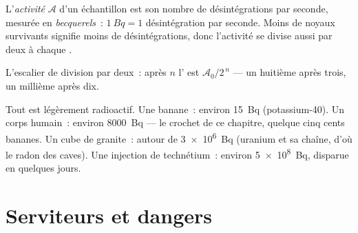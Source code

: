 \begin{definition}[Activité]\label{def:g11:nucleus-radioactivity:activity}
L'\emph{activité} $\mathcal A$ d'un échantillon est
son nombre de désintégrations par seconde, mesurée en
\emph{becquerels}~: $\qty{1}{Bq} = 1$
désintégration par seconde. Moins de noyaux survivants signifie moins
de désintégrations, donc l'activité se divise aussi par deux à chaque
.
\end{definition}

\begin{omfigure}

{\small L'escalier de division par deux~: après $n$  l'
 est
$\mathcal A_0/2^{\,n}$ --- un huitième après trois, un millième après
dix.}
\end{omfigure}

\begin{example}\label{ex:g11:nucleus-radioactivity:orders}
Tout est légèrement radioactif. Une banane~: environ \qty{15}{Bq}
(potassium-40). Un corps humain~: environ \qty{8000}{Bq} --- le crochet
de ce chapitre, quelque cinq cents bananes. Un  cube de granite~:
autour de \qty{3e6}{Bq} (uranium et sa chaîne, d'où le radon des
caves). Une injection de technétium~: environ \qty{5e8}{Bq}, disparue
en quelques jours.
\end{example}

\section{Serviteurs et dangers}

